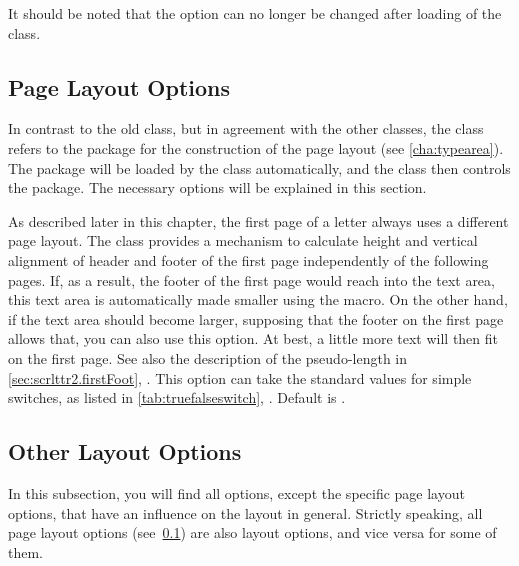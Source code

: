 It should be noted that the option  can no longer be
changed after loading of the class.%
%
%
%
%

\subsection{Page Layout Options}
\label{sec:scrlttr2.typeareaOptions}
%

In contrast to the old  class, but in agreement with
the other {\KOMAScript} classes, the  class refers to
the  package for the construction of the page layout
(see \autoref{cha:typearea}). The package will be loaded by the class
automatically, and the class then controls the package. The necessary
options will be explained in this section.

\begin{Declaration}
\end{Declaration}
%
As described later in this chapter, the first page of a letter always
uses a different page layout. The  class provides a
mechanism to calculate height and vertical alignment of header and
footer of the first page independently of the following pages. If, as
a result, the footer of the first page would reach into the text area,
this text area is automatically made smaller using the
 macro. On the other
hand, if the text area should become larger, supposing that the footer
on the first page allows that, you can also use this option. At best,
a little more text will then fit on the first page. See also the
description of the pseudo-length  in
\autoref{sec:scrlttr2.firstFoot},
.  This option can
take the standard values for simple switches, as listed in
\autoref{tab:truefalseswitch},
. Default is
.
%
%
%
%

\subsection{Other Layout Options}
\label{sec:scrlttr2.layout}

In this subsection, you will find all options, except the specific
page layout options, that have an influence on the layout in
general. Strictly speaking, all page layout options
(see~\ref{sec:scrlttr2.typeareaOptions}) are also layout options, and
vice versa for some of them.

